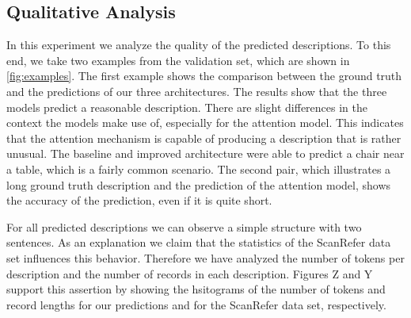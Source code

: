 \documentclass[10pt,twocolumn,letterpaper]{article}
\begin{document}
\subsection{Qualitative Analysis}
In this experiment we analyze the quality of the predicted descriptions. To this end, we take two examples from the validation set, which are shown in  \autoref{fig:examples}. 
The first example shows the comparison between the ground truth and the predictions of our three architectures. The results show that the three models predict a reasonable description. There are slight differences in the context the models make use of, especially for the attention model. This indicates that the attention mechanism is capable of producing a description that is rather unusual. The baseline and improved architecture were able to predict a chair near a table, which is a fairly common scenario. 
The second pair, which illustrates a long ground truth description and the prediction of the attention model, shows the accuracy of the prediction, even if it is quite short. 

For all predicted descriptions we can observe a simple structure with two sentences. As an explanation we claim that the statistics of the ScanRefer data set influences this behavior. Therefore we have analyzed the number of tokens per description and the number of records in each description. Figures Z and Y support this assertion by showing the hsitograms of the number of tokens and record lengths for our predictions and for the ScanRefer data set, respectively.
\end{document}
